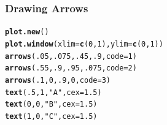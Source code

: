 \documentclass[12pt]{beamer}\usepackage[]{graphicx}\usepackage[]{color}
\makeatletter
\newcommand{\hlnum}[1]{\textcolor[rgb]{0.686,0.059,0.569}{#1}}%
\newcommand{\hlstr}[1]{\textcolor[rgb]{0.192,0.494,0.8}{#1}}%
\newcommand{\hlstd}[1]{\textcolor[rgb]{0.345,0.345,0.345}{#1}}%
\newcommand{\hlkwc}[1]{\textcolor[rgb]{0.333,0.667,0.333}{#1}}%
\newcommand{\hlkwd}[1]{\textcolor[rgb]{0.737,0.353,0.396}{\textbf{#1}}}%
\newenvironment{kframe}{%
 \def\at@end@of@kframe{}%
 \ifinner\ifhmode%
  \def\at@end@of@kframe{\end{minipage}}%
  \begin{minipage}{\columnwidth}%
 \fi\fi%
 \def\FrameCommand##1{\hskip\@totalleftmargin \hskip-\fboxsep
 \colorbox{shadecolor}{##1}\hskip-\fboxsep
     \hskip-\linewidth \hskip-\@totalleftmargin \hskip\columnwidth}%
 \MakeFramed {\advance\hsize-\width
   \@totalleftmargin\z@ \linewidth\hsize
   \@setminipage}}%
 {\par\unskip\endMakeFramed%
 \at@end@of@kframe}
\newenvironment{knitrout}{}{} %
\makeatother
\begin{document}

\begin{frame}[fragile]
\frametitle{Drawing Arrows}
\begin{knitrout}\footnotesize
{}\color{fgcolor}\begin{kframe}
\begin{alltt}
\hlkwd{plot.new}\hlstd{()}
\hlkwd{plot.window}\hlstd{(}\hlkwc{xlim} \hlstd{=} \hlkwd{c}\hlstd{(}\hlnum{0}\hlstd{,} \hlnum{1}\hlstd{),} \hlkwc{ylim} \hlstd{=} \hlkwd{c}\hlstd{(}\hlnum{0}\hlstd{,} \hlnum{1}\hlstd{))}
\hlkwd{arrows}\hlstd{(}\hlnum{.05}\hlstd{,} \hlnum{.075}\hlstd{,} \hlnum{.45}\hlstd{,} \hlnum{.9}\hlstd{,} \hlkwc{code} \hlstd{=} \hlnum{1}\hlstd{)}
\hlkwd{arrows}\hlstd{(}\hlnum{.55}\hlstd{,} \hlnum{.9}\hlstd{,} \hlnum{.95}\hlstd{,} \hlnum{.075}\hlstd{,} \hlkwc{code} \hlstd{=} \hlnum{2}\hlstd{)}
\hlkwd{arrows}\hlstd{(}\hlnum{.1}\hlstd{,} \hlnum{0}\hlstd{,} \hlnum{.9}\hlstd{,} \hlnum{0}\hlstd{,} \hlkwc{code} \hlstd{=} \hlnum{3}\hlstd{)}
\hlkwd{text}\hlstd{(}\hlnum{.5}\hlstd{,} \hlnum{1}\hlstd{,} \hlstr{"A"}\hlstd{,} \hlkwc{cex} \hlstd{=} \hlnum{1.5}\hlstd{)}
\hlkwd{text}\hlstd{(}\hlnum{0}\hlstd{,} \hlnum{0}\hlstd{,} \hlstr{"B"}\hlstd{,} \hlkwc{cex} \hlstd{=} \hlnum{1.5}\hlstd{)}
\hlkwd{text}\hlstd{(}\hlnum{1}\hlstd{,} \hlnum{0}\hlstd{,} \hlstr{"C"}\hlstd{,} \hlkwc{cex} \hlstd{=} \hlnum{1.5}\hlstd{)}
\end{alltt}
\end{kframe}
\end{knitrout}
\end{frame}

\end{document}
